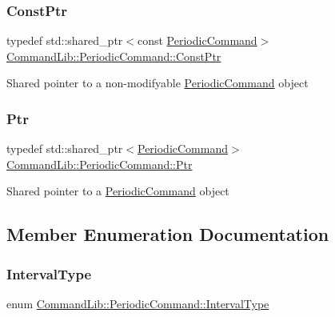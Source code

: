 \subsubsection{\texorpdfstring{Const\+Ptr}{ConstPtr}}
{\footnotesize\ttfamily typedef std\+::shared\+\_\+ptr$<$const \mbox{\hyperlink{class_command_lib_1_1_periodic_command}{Periodic\+Command}}$>$ \mbox{\hyperlink{class_command_lib_1_1_periodic_command_ad004e7ccaad4b0413f341dac73d050fc}{Command\+Lib\+::\+Periodic\+Command\+::\+Const\+Ptr}}}



Shared pointer to a non-\/modifyable \mbox{\hyperlink{class_command_lib_1_1_periodic_command}{Periodic\+Command}} object

\mbox{\label{class_command_lib_1_1_periodic_command_a4aa1af2412d7688c7b9a5d76b240b38a}} 
\subsubsection{\texorpdfstring{Ptr}{Ptr}}
{\footnotesize\ttfamily typedef std\+::shared\+\_\+ptr$<$\mbox{\hyperlink{class_command_lib_1_1_periodic_command}{Periodic\+Command}}$>$ \mbox{\hyperlink{class_command_lib_1_1_periodic_command_a4aa1af2412d7688c7b9a5d76b240b38a}{Command\+Lib\+::\+Periodic\+Command\+::\+Ptr}}}



Shared pointer to a \mbox{\hyperlink{class_command_lib_1_1_periodic_command}{Periodic\+Command}} object



\subsection{Member Enumeration Documentation}
\mbox{\label{class_command_lib_1_1_periodic_command_ac32ef93cf679cd652da30a0ad373d31e}} 
\subsubsection{\texorpdfstring{Interval\+Type}{IntervalType}}
{\footnotesize\ttfamily enum \mbox{\hyperlink{class_command_lib_1_1_periodic_command_ac32ef93cf679cd652da30a0ad373d31e}{Command\+Lib\+::\+Periodic\+Command\+::\+Interval\+Type}}\hspace{0.3cm}{\ttfamily [strong]}}



